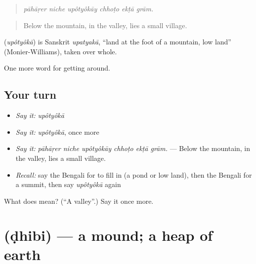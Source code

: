 \begin{quote}
     
\end{quote}

\begin{quote}
\emph{pāhāṛer niche upôtyôkāy chhoṭo ekṭā grām.}
\end{quote}

\begin{quote}
Below the mountain, in the valley, lies a small village.
\end{quote}

\begin{cousinweb}
\textbf{} (\emph{upôtyôkā}) is Sanskrit \emph{upatyakā}, \textquotedblleft{}land at the foot of a mountain, low land\textquotedblright{} (Monier-Williams), taken over whole.
\end{cousinweb}

\begin{grammarlens}[title={What you've built}]
One more word for getting around.
\end{grammarlens}

\subsection*{Your turn}
\begin{itemize}
\raggedright
  \item \emph{Say it:} \emph{upôtyôkā}
  \item \emph{Say it:} \emph{upôtyôkā}, once more
  \item \emph{Say it:} \emph{pāhāṛer niche upôtyôkāy chhoṭo ekṭā grām.} — Below the mountain, in the valley, lies a small village.
  \item \emph{Recall:} say the Bengali for to fill in (a pond or low land), then the Bengali for a summit, then say \emph{upôtyôkā} again
\end{itemize}

\begin{tcolorbox}[breakable,colback=teal!4,colframe=teal!35!black,title={Before you move on}]
What does  mean? (\textquotedblleft{}A valley\textquotedblright{}.) Say it once more.
\end{tcolorbox}
\section[\texorpdfstring{\bn{ঢিবি} (ḍhibi)}{ঢিবি (ḍhibi)}]{ (ḍhibi) — a mound; a heap of earth}

